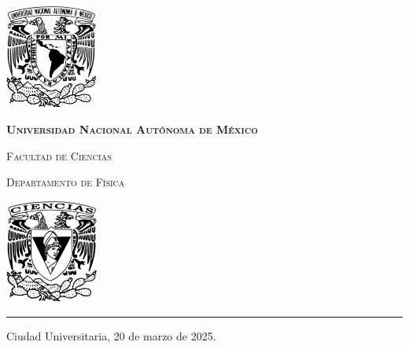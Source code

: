 \documentclass[9pt,letterpaper]{article}
\begin{document}
	
	
	\begin{center}
		\begin{minipage}{3cm}
			\begin{center}
				\includegraphics[height=3.4cm]{../Figuras/Logo_UNAM (1)}
			\end{center}
		\end{minipage}\hfill
		\begin{minipage}{10cm}
			\begin{center}
				{\scshape\LARGE \textbf{Universidad Nacional Autónoma de México} \par}
				{\scshape\Large Facultad de Ciencias\par}
				{\scshape\Large Departamento de Física\par}
			\end{center}
		\end{minipage}\hfill
		\begin{minipage}{3cm}
			\begin{center}
				\includegraphics[height=3.4cm]{../Figuras/Logo_FC (1)}
			\end{center}
		\end{minipage}
	\end{center}
	
	\rule{17cm}{0.1mm}
	
	\hspace{0.5cm}
	
	\parbox{\textwidth}{\raggedleft Ciudad Universitaria, 20 de marzo de 2025.}
	
		\hspace{1cm}
	
		\vspace{0.5cm}
	 
\end{document}
